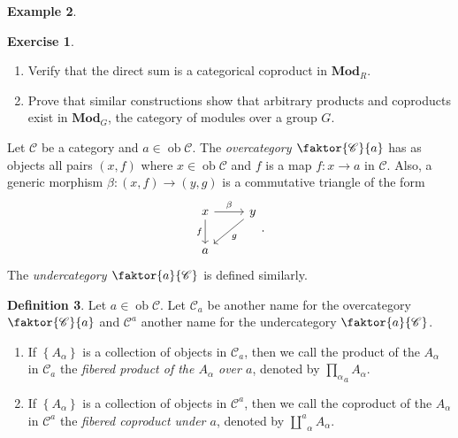 \documentclass[10pt,letterpaper,cm]{nupset}
\theoremstyle{definition}
\newtheorem{definition}{Definition}[subsection]
\newtheorem{exmp}[definition]{Example}
\theoremstyle{theorem}
\newtheorem{exercise}[definition]{Exercise}
\theoremstyle{remark}
\newcommand{\1}{\mathbf{1}}
\renewcommand{\c}{\mathscr{C}}
\newcommand{\0}{\vec 0}
\DeclareMathOperator{\ob}{ob}
\begin{document}
\begin{exmp}
\begin{enumerate}
\begin{exercise} $ $
\begin{enumerate}
\item Verify that the direct sum is a categorical coproduct in $\mathbf{Mod}_R$.
\item Prove that similar constructions show that arbitrary products and coproducts exist in $\mathbf{Mod}_G$, the category of modules over a group $G$.
\end{enumerate}
\end{exercise}
\end{enumerate}
\end{exmp}

\medskip

Let $\c$ be a category and $a\in \ob{\c}$. The \textit{overcategory $\faktor{\c}{a}$} has as objects all pairs $\left(x, f\right)$ where $x\in \ob{\c}$ and $f$ is a map $f : x \to a$ in $\c$. Also, a generic morphism $\beta : \left(x, f\right) \to \left(y,g\right)$ is a commutative triangle of the form
\[
\begin{tikzcd}
x \arrow[d, "f"'] \arrow[r, "\beta"] & y \arrow[ld, "g"] \\
a                                    &                  
\end{tikzcd}.
\] The \textit{undercategory $\faktor{a}{\c}$} is defined similarly.

\begin{definition} Let $a \in \ob \c$. Let $\c_a$ be another name for the overcategory $\faktor{\c}{a}$ and $\c^a$ another name for the undercategory $\faktor{a}{\c}$.
\begin{enumerate}
\item If $\left\{A_{\alpha}\right\}$ is a collection of objects in $\c_a$, then we call the product of the $A_{\alpha}$ in $\c_a$ the \textit{fibered product of the $A_{\alpha}$ over $a$}, denoted by $\underset{a}{\prod_{\alpha}} A_{\alpha}$.
\item If $\left\{A_{\alpha}\right\}$ is a collection of objects in $\c^a$, then we call the coproduct of the $A_{\alpha}$ in $\c^a$ the \textit{fibered coproduct under $a$}, denoted by $\overset{a}{\coprod}_{\alpha}A_{\alpha}$.
\end{enumerate}
\end{definition}
\end{document}
